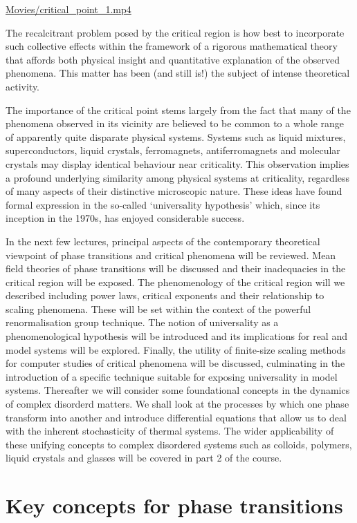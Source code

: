 \documentclass[
  letterpaper,
  enabledeprecatedfontcommands]{report}
\begin{document}
\url{Movies/critical_point_1.mp4}

The recalcitrant problem posed by the critical region is how best to
incorporate such collective effects within the framework of a rigorous
mathematical theory that affords both physical insight and quantitative
explanation of the observed phenomena. This matter has been (and still
is!) the subject of intense theoretical activity.

The importance of the critical point stems largely from the fact that
many of the phenomena observed in its vicinity are believed to be common
to a whole range of apparently quite disparate physical systems. Systems
such as liquid mixtures, superconductors, liquid crystals, ferromagnets,
antiferromagnets and molecular crystals may display identical behaviour
near criticality. This observation implies a profound underlying
similarity among physical systems at criticality, regardless of many
aspects of their distinctive microscopic nature. These ideas have found
formal expression in the so-called `universality hypothesis' which,
since its inception in the 1970s, has enjoyed considerable success.

In the next few lectures, principal aspects of the contemporary
theoretical viewpoint of phase transitions and critical phenomena will
be reviewed. Mean field theories of phase transitions will be discussed
and their inadequacies in the critical region will be exposed. The
phenomenology of the critical region will we described including power
laws, critical exponents and their relationship to scaling phenomena.
These will be set within the context of the powerful renormalisation
group technique. The notion of universality as a phenomenological
hypothesis will be introduced and its implications for real and model
systems will be explored. Finally, the utility of finite-size scaling
methods for computer studies of critical phenomena will be discussed,
culminating in the introduction of a specific technique suitable for
exposing universality in model systems. Thereafter we will consider some
foundational concepts in the dynamics of complex disorderd matters. We
shall look at the processes by which one phase transform into another
and introduce differential equations that allow us to deal with the
inherent stochasticity of thermal systems. The wider applicability of
these unifying concepts to complex disordered systems such as colloids,
polymers, liquid crystals and glasses will be covered in part 2 of the
course.

\chapter{Key concepts for phase transitions}\label{sec-background}
\end{document}
